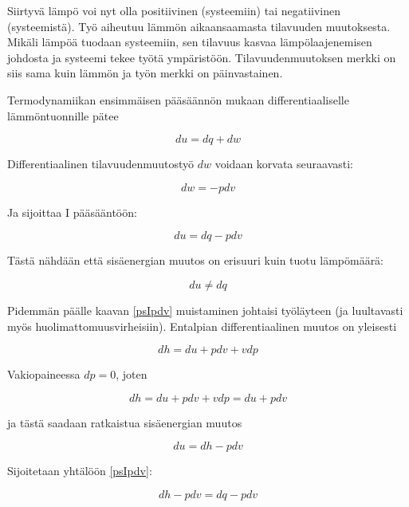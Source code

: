 \documentclass[12pt,a4paper,finnish]{book}
\begin{document}
Siirtyvä lämpö voi nyt  
olla positiivinen (systeemiin) tai negatiivinen (systeemistä). Työ aiheutuu lämmön aikaansaamasta tilavuuden muutoksesta. 
Mikäli lämpöä tuodaan systeemiin, sen tilavuus kasvaa lämpölaajenemisen johdosta ja systeemi tekee työtä ympäristöön. 
Tilavuudenmuutoksen merkki on siis sama kuin lämmön ja työn merkki on päinvastainen.

Termodynamiikan ensimmäisen pääsäännön mukaan differentiaaliselle lämmöntuonnille pätee

\begin{equation}
 du = dq + dw
\end{equation}

Differentiaalinen tilavuudenmuutostyö $dw$ voidaan korvata seuraavasti:

\begin{equation}
 dw = -pdv
\end{equation}

Ja sijoittaa I pääsääntöön:

\begin{equation}
\label{psIpdv}
 du = dq - pdv
\end{equation}

Tästä nähdään että sisäenergian muutos on erisuuri kuin tuotu lämpömäärä:

\begin{equation}
 du \neq dq
\end{equation}

Pidemmän päälle kaavan \ref{psIpdv} muistaminen johtaisi työläyteen (ja luultavasti myös huolimattomuusvirheisiin). Entalpian 
differentiaalinen muutos on yleisesti

\begin{equation}
 dh = du + pdv + vdp
\end{equation}

Vakiopaineessa $dp = 0$, joten

\begin{equation}
 dh = du + pdv + vdp = du + pdv 
\end{equation}

ja tästä saadaan ratkaistua sisäenergian muutos

\begin{equation}
 du = dh - pdv
\end{equation}

Sijoitetaan yhtälöön \ref{psIpdv}:

\begin{equation}
 dh - pdv = dq - pdv
\end{equation}
\end{document}
